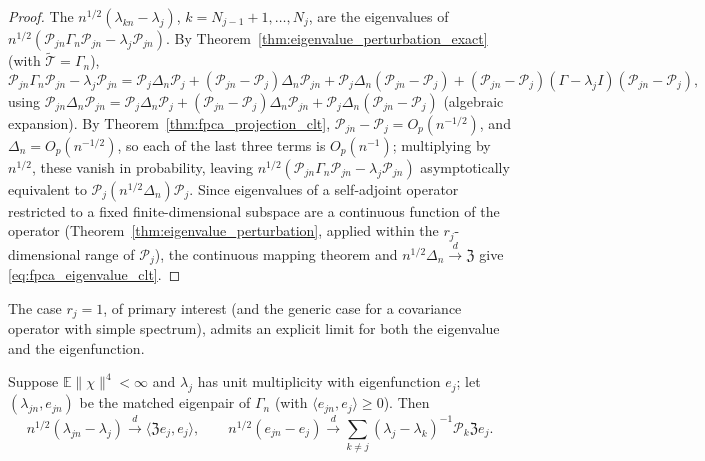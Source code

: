 \begin{proof}
The $n^{1/2}(\lambda_{kn}-\lambda_j)$, $k=N_{j-1}+1,\dots,N_j$, are the
eigenvalues of $n^{1/2}(\mathcal{P}_{jn}\Gamma_n\mathcal{P}_{jn}-\lambda_j
\mathcal{P}_{jn})$. By Theorem~\ref{thm:eigenvalue_perturbation_exact}
(with $\widetilde{\mathcal{T}}=\Gamma_n$),
\[
\mathcal{P}_{jn}\Gamma_n\mathcal{P}_{jn}-\lambda_j\mathcal{P}_{jn} =
\mathcal{P}_j\Delta_n\mathcal{P}_j + (\mathcal{P}_{jn}-\mathcal{P}_j)
\Delta_n\mathcal{P}_{jn} + \mathcal{P}_j\Delta_n(\mathcal{P}_{jn}-
\mathcal{P}_j) + (\mathcal{P}_{jn}-\mathcal{P}_j)(\Gamma-\lambda_jI)
(\mathcal{P}_{jn}-\mathcal{P}_j),
\]
using $\mathcal{P}_{jn}\Delta_n\mathcal{P}_{jn}=\mathcal{P}_j\Delta_n
\mathcal{P}_j+(\mathcal{P}_{jn}-\mathcal{P}_j)\Delta_n\mathcal{P}_{jn}+
\mathcal{P}_j\Delta_n(\mathcal{P}_{jn}-\mathcal{P}_j)$ (algebraic
expansion). By Theorem~\ref{thm:fpca_projection_clt}, $\mathcal{P}_{jn}-
\mathcal{P}_j=O_p(n^{-1/2})$, and $\Delta_n=O_p(n^{-1/2})$, so each of the
last three terms is $O_p(n^{-1})$; multiplying by $n^{1/2}$, these vanish
in probability, leaving $n^{1/2}(\mathcal{P}_{jn}\Gamma_n\mathcal{P}_{jn}-
\lambda_j\mathcal{P}_{jn})$ asymptotically equivalent to $\mathcal{P}_j
(n^{1/2}\Delta_n)\mathcal{P}_j$. Since eigenvalues of a self-adjoint
operator restricted to a fixed finite-dimensional subspace are a continuous
function of the operator (Theorem~\ref{thm:eigenvalue_perturbation}, applied
within the $r_j$-dimensional range of $\mathcal{P}_j$), the continuous
mapping theorem and $n^{1/2}\Delta_n\xrightarrow{d}\mathfrak{Z}$ give
\eqref{eq:fpca_eigenvalue_clt}.
\end{proof}

The case $r_j=1$, of primary interest (and the generic case for a
covariance operator with simple spectrum), admits an explicit limit for
both the eigenvalue and the eigenfunction.

\begin{theorem}
\label{thm:fpca_simple_eigenvalue_clt}
Suppose $\mathbb{E}\|\chi\|^4<\infty$ and $\lambda_j$ has unit multiplicity
with eigenfunction $e_j$; let $(\lambda_{jn},e_{jn})$ be the matched
eigenpair of $\Gamma_n$ (with $\langle e_{jn},e_j\rangle\geq0$). Then
\begin{equation}
n^{1/2}(\lambda_{jn}-\lambda_j) \xrightarrow{d} \langle\mathfrak{Z}e_j,
e_j\rangle, \qquad
n^{1/2}(e_{jn}-e_j) \xrightarrow{d} \sum_{k\neq j}(\lambda_j-\lambda_k)^{-1}
\mathcal{P}_k\mathfrak{Z}e_j.
\label{eq:fpca_simple_clt}
\end{equation}
\end{theorem}

